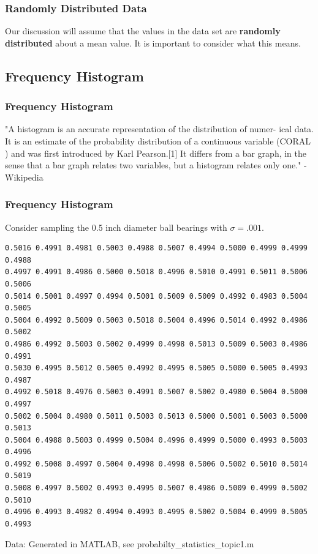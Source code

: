 \documentclass[fleqn]{beamer} %
\newcommand{\sectionIsubsectionIItitle}{Randomly Distributed Data}
\newcommand{\sectionIsubsectionIIItitle}{Frequency Histogram}
\begin{document}
			\begin{frame}
				\frametitle{\sectionIsubsectionIItitle}

				Our discussion will assume that the values in the data set are {\bf \PN randomly distributed } about a mean value. It is important to consider what this means.
				
			\end{frame}

		\subsection{\sectionIsubsectionIIItitle}\label{sectionIsubsectionIII}
			\begin{frame} 
				\frametitle{\sectionIsubsectionIIItitle}
				\bigskip

					"A {\GR histogram} is an accurate representation of the distribution of numer-
					ical data. It is an estimate of the probability distribution of a continuous
					variable (CORAL ) and was first introduced by Karl Pearson.[1] It differs
					from a bar graph, in the sense that a bar graph relates two variables, but a
					histogram relates only one." - Wikipedia

			\end{frame}	

			\begin{frame}[containsverbatim] 
				\frametitle{\sectionIsubsectionIIItitle}

				Consider sampling the 0.5 inch diameter ball bearings with $\sigma=.001$.

				\lstset{basicstyle=\scriptsize}

				\begin{lstlisting}
0.5016 0.4991 0.4981 0.5003 0.4988 0.5007 0.4994 0.5000 0.4999 0.4999 0.4988  
0.4997 0.4991 0.4986 0.5000 0.5018 0.4996 0.5010 0.4991 0.5011 0.5006 0.5006  
0.5014 0.5001 0.4997 0.4994 0.5001 0.5009 0.5009 0.4992 0.4983 0.5004 0.5005 
0.5004 0.4992 0.5009 0.5003 0.5018 0.5004 0.4996 0.5014 0.4992 0.4986 0.5002 
0.4986 0.4992 0.5003 0.5002 0.4999 0.4998 0.5013 0.5009 0.5003 0.4986 0.4991
0.5030 0.4995 0.5012 0.5005 0.4992 0.4995 0.5005 0.5000 0.5005 0.4993 0.4987 
0.4992 0.5018 0.4976 0.5003 0.4991 0.5007 0.5002 0.4980 0.5004 0.5000 0.4997 
0.5002 0.5004 0.4980 0.5011 0.5003 0.5013 0.5000 0.5001 0.5003 0.5000 0.5013  
0.5004 0.4988 0.5003 0.4999 0.5004 0.4996 0.4999 0.5000 0.4993 0.5003 0.4996  
0.4992 0.5008 0.4997 0.5004 0.4998 0.4998 0.5006 0.5002 0.5010 0.5014 0.5019
0.5008 0.4997 0.5002 0.4993 0.4995 0.5007 0.4986 0.5009 0.4999 0.5002 0.5010  
0.4996 0.4993 0.4982 0.4994 0.4993 0.4995 0.5002 0.5004 0.4999 0.5005 0.4993 
				\end{lstlisting}

				{\tiny Data: Generated in MATLAB, see probabilty\_statistics\_topic1.m }
				
			\end{frame}	
\end{document}
